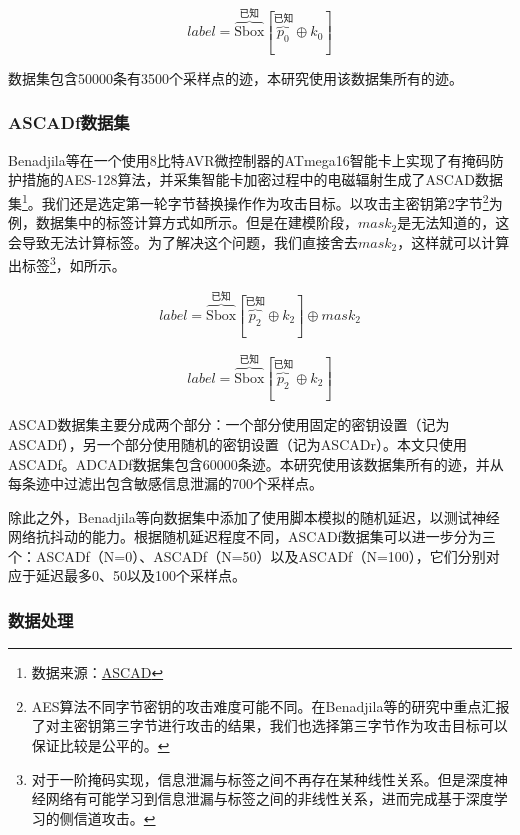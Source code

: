{	\begin{equation}\label{eq:aesrdmodel}
		label=\overbrace{\mathrm{Sbox}}^{\mbox{已知}}[\overbrace{p_0}^{\mbox{已知}}\oplus k_0]
	\end{equation}
	
	数据集包含50000条有3500个采样点的迹，本研究使用该数据集所有的迹。
	\subsubsection{ASCADf数据集}
	Benadjila等\citep{Benadjila20}在一个使用8比特AVR微控制器的ATmega16智能卡上实现了有掩码防护措施的AES-128算法，并采集智能卡加密过程中的电磁辐射生成了ASCAD数据集\footnote{数据来源：\href{https://github.com/ANSSI-FR/ASCAD}{ASCAD}}。我们还是选定第一轮字节替换操作作为攻击目标。以攻击主密钥第2字节\footnote{AES算法不同字节密钥的攻击难度可能不同。在Benadjila等的研究中重点汇报了对主密钥第三字节进行攻击的结果，我们也选择第三字节作为攻击目标可以保证比较是公平的。}为例，数据集中的标签计算方式如所示。但是在建模阶段，$mask_2$是无法知道的，这会导致无法计算标签。为了解决这个问题，我们直接舍去$mask_2$，这样就可以计算出标签\footnote{对于一阶掩码实现，信息泄漏与标签之间不再存在某种线性关系。但是深度神经网络有可能学习到信息泄漏与标签之间的非线性关系，进而完成基于深度学习的侧信道攻击。}，如所示。
	
	\begin{equation}\label{eq:ascadbadmodel}
		label=\overbrace{\mathrm{Sbox}}^{\mbox{已知}}[\overbrace{p_2}^{\mbox{已知}}\oplus k_2]\oplus mask_2
	\end{equation}
	
	\begin{equation}\label{eq:ascadmodel}
		label=\overbrace{\mathrm{Sbox}}^{\mbox{已知}}[\overbrace{p_2}^{\mbox{已知}}\oplus k_2]
	\end{equation}
	
	ASCAD数据集主要分成两个部分：一个部分使用固定的密钥设置（记为ASCADf），另一个部分使用随机的密钥设置（记为ASCADr）。本文只使用ASCADf。ADCADf数据集包含60000条迹。本研究使用该数据集所有的迹，并从每条迹中过滤出包含敏感信息泄漏的700个采样点。
	
	除此之外，Benadjila等向数据集中添加了使用脚本模拟的随机延迟，以测试神经网络抗抖动的能力。根据随机延迟程度不同，ASCADf数据集可以进一步分为三个：ASCADf（N=0）、ASCADf（N=50）以及ASCADf（N=100），它们分别对应于延迟最多0、50以及100个采样点。
	
	\subsubsection{数据处理}
	
}
